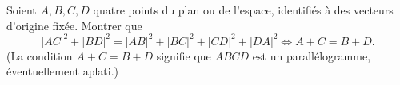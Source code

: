 Soient $A, B, C, D$ quatre points du plan ou de l'espace, identifiés à des
vecteurs d'origine fixée. Montrer que
\[
|AC|^2 + |BD|^2 = |AB|^2 + |BC|^2 + |CD|^2 + |DA|^2
\iff A + C = B + D.
\]
(La condition $A+C=B+D$ signifie que $ABCD$ est un parallélogramme,
éventuellement aplati.)
